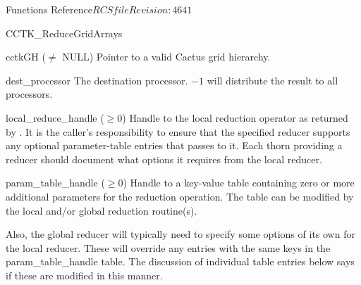 \begin{cactuspart}{ Functions Reference}{$RCSfile$}{$Revision: 4641 $}
\begin{FunctionDescription}{CCTK\_ReduceGridArrays}
\begin{ParameterSection}
\begin{Parameter}{cctkGH ($\ne$ NULL)}
Pointer to a valid Cactus grid hierarchy.
\end{Parameter}
\begin{Parameter}{dest\_processor}
The destination processor. $-1$ will distribute the result to all processors.
\end{Parameter}
\begin{Parameter}{local\_reduce\_handle ($\ge 0$)}
Handle to the local reduction operator as returned by \newline
{}. It is the caller's responsibility
to ensure that the specified reducer supports any optional
parameter-table entries that \newline {} passes to it.
Each thorn providing a \newline {} reducer should
document what options it requires from the local reducer.
\end{Parameter}
\begin{Parameter}{param\_table\_handle ($\ge 0$)}
Handle to a key-value table containing zero or more additional parameters
for the reduction operation. The table can be modified by the local
and/or global reduction routine(s).

Also, the global reducer will typically need to specify some options
of its own for the local reducer.  These will override any entries
with the same keys in the  param\_table\_handle  table.  The discussion
of individual table entries below says if these are modified in this
manner.


\end{Parameter}
\end{ParameterSection}
\end{FunctionDescription}
\end{cactuspart}
